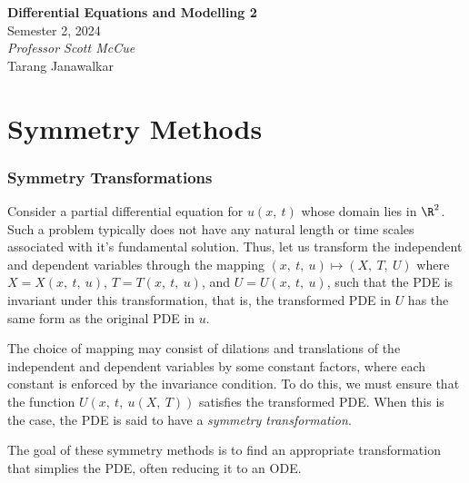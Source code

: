 \documentclass{article}
\date{}
\theoremstyle{definition}
\newcommand{\unitName}{Differential Equations and Modelling 2}
\newcommand{\unitTime}{Semester 2, 2024}
\newcommand{\unitCoordinator}{Professor Scott McCue}
\newcommand{\documentAuthors}{Tarang Janawalkar}
\begin{document}
%
\begin{titlepage}
    \vspace*{\fill}
    \begin{center}
        \LARGE{\textbf{\unitName}} \\[0.1in]
        \normalsize{\unitTime} \\[0.2in]
        \normalsize\textit{\unitCoordinator} \\[0.2in]
        \documentAuthors
    \end{center}
    \vspace*{\fill}
    \doclicenseThis
    \thispagestyle{empty}
\end{titlepage}
\newpage
%
\tableofcontents
\newpage
%
\part{Symmetry Methods}
\section{Symmetry Transformations}
Consider a partial differential equation for \(u\left( x,\: t \right)\)
whose domain lies in \(\R^2\). Such a problem typically does not have
any natural length or time scales associated with it's fundamental
solution. Thus, let us transform the independent and dependent
variables through the mapping \(\left( x,\: t,\: u \right) \mapsto
\left( X,\: T,\: U \right)\) where \(X = X\left( x,\: t,\: u \right)\),
\(T = T\left( x,\: t,\: u \right)\), and \(U = U\left( x,\: t,\: u
\right)\), such that the PDE is invariant under this transformation,
that is, the transformed PDE in \(U\) has the same form as the original
PDE in \(u\).

The choice of mapping may consist of dilations and translations of the
independent and dependent variables by some constant factors, where
each constant is enforced by the invariance condition. To do this, we
must ensure that the function \(U\left( x,\: t,\: u\left( X,\: T
\right) \right)\) satisfies the transformed PDE. When this is the case,
the PDE is said to have a \textit{symmetry transformation}.

The goal of these symmetry methods is to find an appropriate
transformation that simplies the PDE, often reducing it to an ODE.
\end{document}
